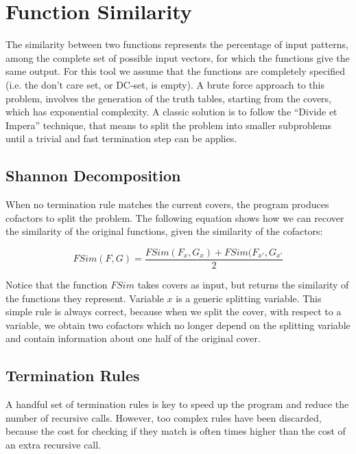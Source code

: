 \documentclass{acm_proc_article-sp}
\begin{document}
\section{Function Similarity}

The similarity between two functions represents the percentage of input patterns,
among the complete set of possible input vectors, for which the functions give
the same output.
For this tool we assume that the functions are completely specified (i.e. the
don't care set, or DC-set, is empty).
A brute force approach to this problem, involves the generation of the truth
tables, starting from the covers, which has exponential complexity. A classic
solution is to follow the ``Divide et Impera'' technique, that means to split
the problem into smaller subproblems until a trivial and fast termination
step can be applies.

\subsection{Shannon Decomposition}

When no termination rule matches the current covers, the program produces
cofactors to split the problem. The following equation shows how we can
recover the similarity of the original functions, given the similarity of the
cofactors:

\begin{equation}
  \label{eq:shannon}
  FSim(F, G) = \frac{FSim(F_{x}, G_{x}) + FSim(F_{x'}, G_{x'}}{2}
\end{equation}

Notice that the function $FSim$ takes covers as input, but returns the similarity
of the functions they represent. Variable $x$ is a generic splitting variable.
This simple rule is always correct, because when we split the cover, with respect
to a variable, we obtain two cofactors which no longer depend on the splitting
variable and contain information about one half of the original cover.

\subsection{Termination Rules}

A handful set of termination rules is key to speed up the program and reduce
the number of recursive calls. However, too complex rules have been discarded,
because the cost for checking if they match is often times higher than the cost
of an extra recursive call.
\end{document}

